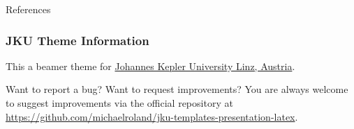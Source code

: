 \documentclass[utf8,aspectratio=169,ngerman,english]{beamer}
\begin{document}
\begin{frame}{References}


\end{frame}


\begin{frame}
\frametitle{JKU Theme Information}

This a beamer theme for \href{https://www.jku.at/}{Johannes Kepler University Linz, Austria}.

\bigskip
\begin{exampleblock}{Want to report a bug? Want to request improvements?}
You are always welcome to suggest improvements via the official repository at \url{https://github.com/michaelroland/jku-templates-presentation-latex}.
\end{exampleblock}
\end{frame}


\jkulogo
\end{document}
